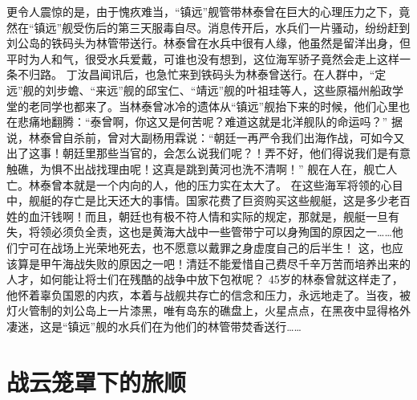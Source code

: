 \documentclass[12pt,UTF8]{ctexbook}
\begin{document}
更令人震惊的是，由于愧疚难当，“镇远”舰管带林泰曾在巨大的心理压力之下，竟然在“镇远”舰受伤后的第三天服毒自尽。消息传开后，水兵们一片骚动，纷纷赶到刘公岛的铁码头为林管带送行。林泰曾在水兵中很有人缘，他虽然是留洋出身，但平时为人和气，很受水兵爱戴，可谁也没有想到，这位海军骄子竟然会走上这样一条不归路。
丁汝昌闻讯后，也急忙来到铁码头为林泰曾送行。在人群中，“定远”舰的刘步蟾、“来远”舰的邱宝仁、“靖远”舰的叶祖珪等人，这些原福州船政学堂的老同学也都来了。当林泰曾冰冷的遗体从“镇远”舰抬下来的时候，他们心里也在悲痛地翻腾：“泰曾啊，你这又是何苦呢？难道这就是北洋舰队的命运吗？”
据说，林泰曾自杀前，曾对大副杨用霖说：“朝廷一再严令我们出海作战，可如今又出了这事！朝廷里那些当官的，会怎么说我们呢？！弄不好，他们得说我们是有意触礁，为惧不出战找理由呢！这真是跳到黄河也洗不清啊！”
舰在人在，舰亡人亡。林泰曾本就是一个内向的人，他的压力实在太大了。
在这些海军将领的心目中，舰艇的存亡是比天还大的事情。国家花费了巨资购买这些舰艇，这是多少老百姓的血汗钱啊！而且，朝廷也有极不符人情和实际的规定，那就是，舰艇一旦有失，将领必须负全责，这也是黄海大战中一些管带宁可以身殉国的原因之一……他们宁可在战场上光荣地死去，也不愿意以戴罪之身虚度自己的后半生！
这，也应该算是甲午海战失败的原因之一吧！清廷不能爱惜自己费尽千辛万苦而培养出来的人才，如何能让将士们在残酷的战争中放下包袱呢？
45岁的林泰曾就这样走了，他怀着辜负国恩的内疚，本着与战舰共存亡的信念和压力，永远地走了。当夜，被灯火管制的刘公岛上一片漆黑，唯有岛东的礁盘上，火星点点，在黑夜中显得格外凄迷，这是“镇远”舰的水兵们在为他们的林管带焚香送行……


\chapter{战云笼罩下的旅顺}
\end{document}
